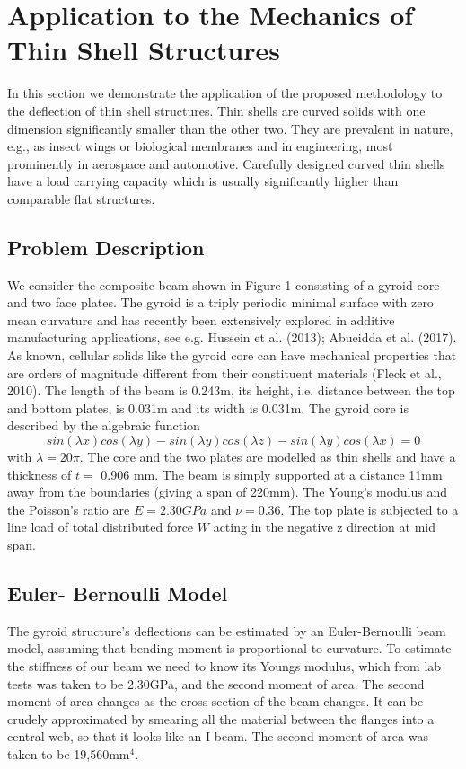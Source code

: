 \documentclass{article}
\begin{document}
\section{Application to the Mechanics of Thin Shell Structures}

In this section we demonstrate the application of the proposed methodology to the deflection of thin shell structures. Thin shells are curved solids with one dimension significantly smaller than the other two. They are prevalent in nature, e.g., as insect wings or biological membranes and in engineering, most prominently in aerospace and automotive. Carefully designed curved thin shells have a load carrying capacity which is usually significantly higher than comparable flat structures.\\

\subsection{Problem Description}
We consider the composite beam shown in Figure 1 consisting of a gyroid core and two face plates. The gyroid is a triply periodic minimal surface with zero mean curvature and has recently been extensively explored in additive manufacturing applications, see e.g. Hussein et al. (2013); Abueidda et al. (2017). As known, cellular solids like the gyroid core can have mechanical properties that are orders of magnitude different from their constituent materials (Fleck et al., 2010). The length of the beam is 0.243m, its height, i.e. distance between the top and bottom plates, is 0.031m and its width is 0.031m. The gyroid core is described by the algebraic function\\

\begin{equation}
sin(\lambda x) cos(\lambda y) - sin(\lambda y) cos(\lambda z) - sin(\lambda y) cos(\lambda x) = 0
\end{equation}
with $\lambda = 20\pi$. The core and the two plates are modelled as thin shells and have a thickness of $t =$ 0.906 mm.
The beam is simply supported at a distance 11mm away from the boundaries (giving a span of 220mm). The Young’s modulus and the Poisson’s ratio are $E = 2.30 GPa$ and $\nu = 0.36$. The top plate is subjected to a line load of total distributed force $W$ acting in the negative z direction at mid span.
\subsection{Euler- Bernoulli Model}
The gyroid structure’s deflections can be estimated by an Euler-Bernoulli beam model, assuming that bending moment is proportional to curvature. To estimate the stiffness of our beam we need to know its Youngs modulus, which from lab tests was taken to be 2.30GPa, and the second moment of area. The second moment of area changes as the cross section of the beam changes. It can be crudely approximated by smearing all the material between the flanges into a central web, so that it looks like an I beam. The second moment of area was taken to be 19,560mm$^4$.
\end{document}
